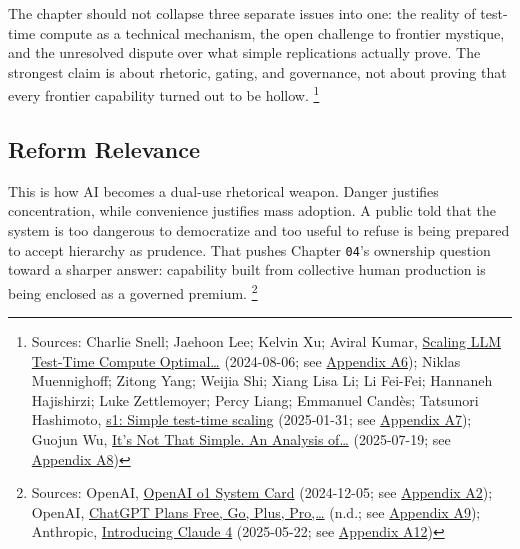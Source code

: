 \documentclass[
  american,
  11pt,
  letterpaper,
]{article}
\begin{document}
The chapter should not collapse three separate issues into one: the
reality of test-time compute as a technical mechanism, the open
challenge to frontier mystique, and the unresolved dispute over what
simple replications actually prove. The strongest claim is about
rhetoric, gating, and governance, not about proving that every frontier
capability turned out to be hollow. \footnote{Sources: Charlie Snell;
  Jaehoon Lee; Kelvin Xu; Aviral Kumar,
  \href{https://arxiv.org/abs/2408.03314}{Scaling LLM Test-Time Compute
  Optimal\ldots{}} (2024-08-06; see
  \hyperref[ch-06-appendix-a6-scaling-llm-test-time-compute-optimally-can-be-more-effective-than-scaling-model-parameters]{Appendix
  A6}); Niklas Muennighoff; Zitong Yang; Weijia Shi; Xiang Lisa Li; Li
  Fei-Fei; Hannaneh Hajishirzi; Luke Zettlemoyer; Percy Liang; Emmanuel
  Candès; Tatsunori Hashimoto,
  \href{https://arxiv.org/abs/2501.19393}{s1: Simple test-time scaling}
  (2025-01-31; see
  \hyperref[ch-06-appendix-a7-s1-simple-test-time-scaling]{Appendix
  A7}); Guojun Wu, \href{https://arxiv.org/abs/2507.14419}{It's Not That
  Simple. An Analysis of\ldots{}} (2025-07-19; see
  \hyperref[ch-06-appendix-a8-it-s-not-that-simple-an-analysis-of-simple-test-time-scaling]{Appendix
  A8})}

\subsection{Reform Relevance}\label{reform-relevance-6}

This is how AI becomes a dual-use rhetorical weapon. Danger justifies
concentration, while convenience justifies mass adoption. A public told
that the system is too dangerous to democratize and too useful to refuse
is being prepared to accept hierarchy as prudence. That pushes Chapter
\texttt{04}'s ownership question toward a sharper answer: capability
built from collective human production is being enclosed as a governed
premium. \footnote{Sources: OpenAI,
  \href{https://openai.com/index/openai-o1-system-card/}{OpenAI o1
  System Card} (2024-12-05; see
  \hyperref[ch-06-appendix-a2-openai-o1-system-card]{Appendix A2});
  OpenAI, \href{https://chatgpt.com/pricing/}{ChatGPT Plans \textbar{}
  Free, Go, Plus, Pro,\ldots{}} (n.d.; see
  \hyperref[ch-06-appendix-a9-chatgpt-plans-free-go-plus-pro-business-and-enterprise]{Appendix
  A9}); Anthropic,
  \href{https://www.anthropic.com/news/claude-4}{Introducing Claude 4}
  (2025-05-22; see
  \hyperref[ch-06-appendix-a12-introducing-claude-4]{Appendix A12})}
\end{document}
